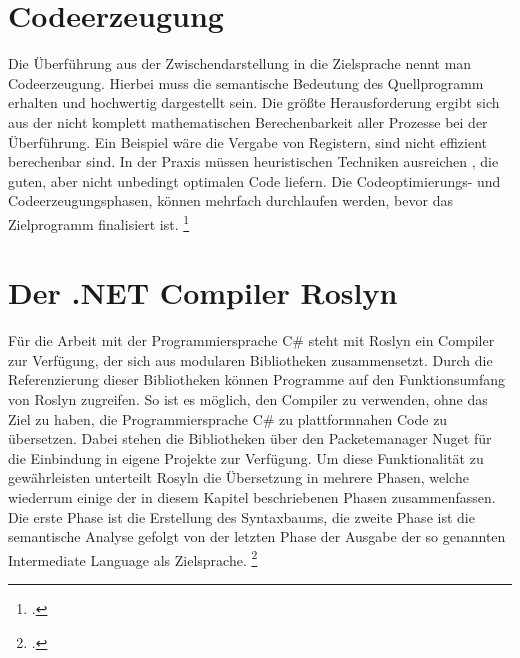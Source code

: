 \section{Codeerzeugung}
Die Überführung aus der Zwischendarstellung in die Zielsprache nennt man Codeerzeugung.  Hierbei muss die semantische Bedeutung des Quellprogramm erhalten und hochwertig dargestellt sein. Die größte Herausforderung ergibt sich aus der nicht komplett mathematischen Berechenbarkeit aller Prozesse bei der Überführung. Ein Beispiel wäre die Vergabe von Registern,  sind nicht effizient berechenbar sind.  In der Praxis müssen heuristischen Techniken ausreichen , die guten, aber nicht unbedingt optimalen Code liefern.  Die Codeoptimierungs- und  Codeerzeugungsphasen,  können mehrfach durchlaufen werden,  bevor das Zielprogramm finalisiert ist. \footcite[Vgl.][S. 618f]{Ullmann2008}

\section{Der .NET Compiler Roslyn}
Für die Arbeit mit der Programmiersprache C\# steht mit Roslyn ein Compiler zur Verfügung, der sich aus modularen Bibliotheken zusammensetzt.  Durch die Referenzierung dieser Bibliotheken können Programme auf den Funktionsumfang von Roslyn zugreifen.  So ist es möglich, den Compiler zu verwenden, ohne das Ziel zu haben, die Programmiersprache C\# zu plattformnahen Code zu übersetzen.  Dabei stehen die Bibliotheken über den Packetemanager Nuget für die Einbindung in eigene Projekte zur Verfügung.  Um diese Funktionalität zu gewährleisten unterteilt Rosyln die Übersetzung in mehrere Phasen,  welche wiederrum einige der in diesem Kapitel beschriebenen Phasen zusammenfassen. Die erste Phase ist die Erstellung des Syntaxbaums, die zweite Phase ist die semantische Analyse gefolgt von der letzten Phase der Ausgabe der so genannten Intermediate Language als Zielsprache. \footcite[Vgl.][S. 1017]{Albahari2020}



